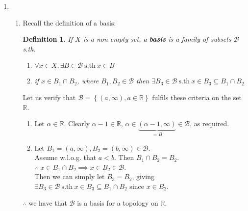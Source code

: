 \documentclass{article}
\newcommand{\sth}{\mathrm{s.th}\ }
\newcommand{\R}{\mathbb{R}}
\newcommand{\Q}{\mathbb{Q}}
\newcommand{\ba}{\mathcal{B}}
\newtheorem{sdefinition}[stheorem]{Definition}
\theoremstyle{remark}
\theoremstyle{example}
\theoremstyle{examples}
\begin{document}
\begin{enumerate}
\begin{proof}
			Let $X \in B'$. Clearly $X=B_r(p)$ for some $r \in \Q^+, p \in \Q^n$.\\
			The ball $X$ is, by definition, open in $\R^n$ w.r.t. the standard (metric) topology.\\
			$\therefore$ every set generated by $B'$ is open in the topology.\\
			\\
			Conversely, let $X$ be an open set in $\R^n$.\\
			Then we have that $\exists \underbrace{X'}_{\ni p} = B_{r'}(p') \in B'$, $r' \in \Q^+, p' \in \Q^n, X'\subseteq X\  \forall p \in X$.\\
			$\therefore X$ is open relative to $B'$.\\
			Thus we have that $B'$ generates the standard (metric) topology on $\R^n$, proving the claim.
		\end{proof}
		This shows that $B'$ is a countable basis for the standard (metric) topology on $\R^n$, as required.\\
		We can thus also conclude that $(\R^n,T_\mathrm{standard})$ is \textit{second countable}.
		
		\item 
		\begin{enumerate}
			\item Recall the definition of a basis:
			\begin{framed}
				\setcounter{section}{2}
				\setcounter{theorem}{2}
				\setcounter{stheorem}{0}
				\begin{sdefinition}
					If $X$ is a non-empty set, a \textbf{basis} is a family of subsets $\ba$ s.th. \begin{enumerate}
						\item $\forall x \in X, \exists B \in \ba\ \sth x \in B$
						\item if $x \in B_1 \cap B_2$, where $B_1,B_2 \in \ba$ then $\exists B_3 \in \ba\ \sth x \in B_3 \subseteq B_1 \cap B_2$
					\end{enumerate}
				\end{sdefinition}
			\end{framed}
			Let us verify that $\ba = \left\{\left(a,\infty\right),a \in \R \right\}$ fulfils these criteria on the set $\R$.\\
			\begin{enumerate}
				\item Let $\alpha  \in \R$. Clearly $\alpha - 1 \in \R$, $\alpha \in \underbrace{(\alpha - 1, \infty)}_{=B} \in \ba$, as required.
				\item Let $B_1=(a,\infty), B_2=(b,\infty) \in \ba$.\\
				Assume w.l.o.g. that $a < b$. Then $B_1 \cap B_2 = B_2$.\\
				$\therefore$ $x \in B_1 \cap B_2 \implies x \in B_2 \in \ba$.\\
				Then we can simply let $B_3 = B_2$, giving $\exists B_3 \in \ba\ \sth x \in B_3 \subseteq B_1 \cap B_2$ since $x \in B_2$.
			\end{enumerate}
			$\therefore$ we have that $\ba$ is a basis for a topology on $\R$.
			

\end{enumerate}
\end{enumerate}
\end{document}
